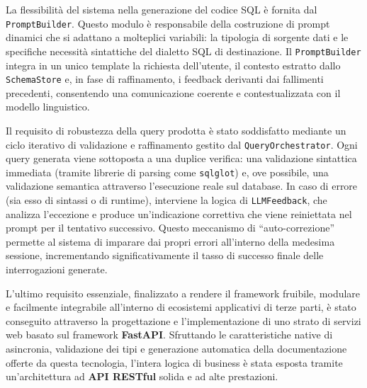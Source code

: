 La flessibilità del sistema nella generazione del codice SQL è fornita
dal \texttt{PromptBuilder}. Questo modulo è responsabile della
costruzione di prompt dinamici che si adattano a molteplici variabili:
la tipologia di sorgente dati e le specifiche necessità sintattiche del
dialetto SQL di destinazione. Il \texttt{PromptBuilder} integra in un
unico template la richiesta dell'utente, il contesto estratto dallo
\texttt{SchemaStore} e, in fase di raffinamento, i feedback derivanti
dai fallimenti precedenti, consentendo una comunicazione coerente e
 contestualizzata con il modello linguistico.

Il requisito di robustezza della query prodotta è stato soddisfatto
mediante un ciclo iterativo di validazione e raffinamento gestito dal
\texttt{QueryOrchestrator}. Ogni query generata viene sottoposta a una
duplice verifica: una validazione sintattica immediata (tramite librerie
di parsing come \texttt{sqlglot}) e, ove possibile, una validazione
semantica attraverso l'esecuzione reale sul database. In caso di errore
(sia esso di sintassi o di runtime), interviene la logica di
\texttt{LLMFeedback}, che analizza l'eccezione e produce un'indicazione
correttiva che viene reiniettata nel prompt per il tentativo successivo.
Questo meccanismo di ``auto-correzione'' permette al sistema di imparare
dai propri errori all'interno della medesima sessione, incrementando
significativamente il tasso di successo finale delle interrogazioni
generate.

L'ultimo requisito essenziale, finalizzato a rendere il framework
fruibile, modulare e facilmente integrabile all'interno di ecosistemi
applicativi di terze parti, è stato conseguito attraverso la
progettazione e l'implementazione di uno strato di servizi web basato
sul framework \textbf{FastAPI}. Sfruttando le caratteristiche native di
asincronia, validazione dei tipi e generazione automatica della
documentazione offerte da questa tecnologia, l'intera logica di business
è stata esposta tramite un'architettura ad \textbf{API RESTful} solida e
ad alte prestazioni.

